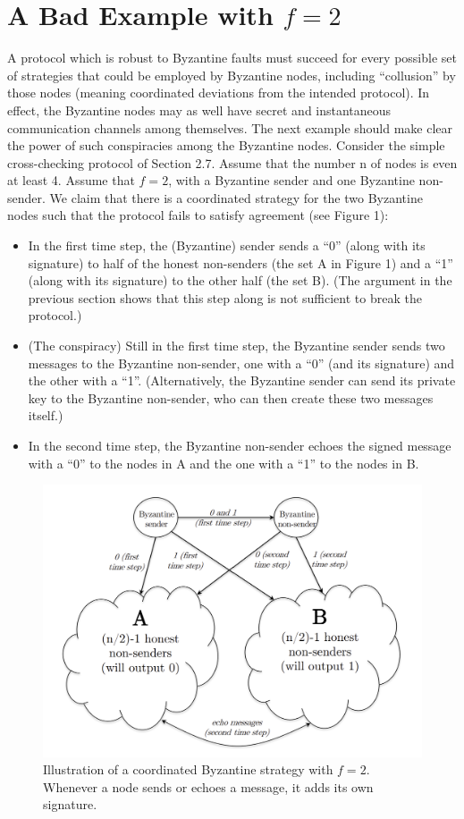 \section{A Bad Example with $f = 2$}
A protocol which is robust to Byzantine faults must succeed for every possible set of strategies that
could be employed by Byzantine nodes, including “collusion” by those nodes (meaning coordinated deviations from the intended protocol). In effect, the Byzantine nodes may as
well have secret and instantaneous communication channels among  themselves. The next
example should make clear the power of such conspiracies among the Byzantine nodes.
Consider the simple cross-checking protocol of Section 2.7. Assume that the number n of
nodes is even at least 4. Assume that $f = 2$, with a Byzantine sender and one Byzantine
non-sender. We claim that there is a coordinated strategy for the two Byzantine nodes such
that the protocol fails to satisfy agreement (see Figure 1):
\begin{itemize}
    \item In the first time step, the (Byzantine) sender sends a “0” (along with its signature)
to half of the honest non-senders (the set A in Figure 1) and a “1” (along with its
signature) to the other half (the set B). (The argument in the previous section shows
that this step along is not sufficient to break the protocol.)
    \item (The conspiracy) Still in the first time step, the Byzantine sender sends two messages
to the Byzantine non-sender, one with a “0” (and its signature) and the other with
a “1”. (Alternatively, the Byzantine sender can send its private key to the Byzantine
non-sender, who can then create these two messages itself.)
    \item In the second time step, the Byzantine non-sender echoes the signed message with a
“0” to the nodes in A and the one with a “1” to the nodes in B.
\end{itemize}
\begin{figure}[h]
    \centering
    \includegraphics[scale = 0.5]{figures/f2.png}
    \caption{Illustration of a coordinated Byzantine strategy with $f = 2$. Whenever
a node sends or echoes a message, it adds its own signature.}
    \label{fig:mesh1}
\end{figure}\\
